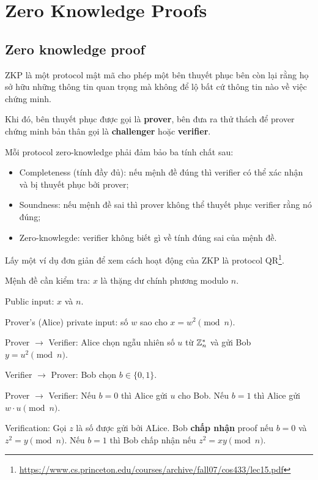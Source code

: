 \chapter{Zero Knowledge Proofs}

\section{Zero knowledge proof}

ZKP là một protocol mật mã cho phép một bên thuyết phục bên còn lại rằng họ sở hữu những thông tin quan trọng mà không để lộ bất cứ thông tin nào về việc chứng minh.

Khi đó, bên thuyết phục được gọi là \textbf{prover}, bên đưa ra thử thách để prover chứng minh bản thân gọi là \textbf{challenger} hoặc \textbf{verifier}.

Mỗi protocol zero-knowledge phải đảm bảo ba tính chất sau:

\begin{itemize}
    \item Completeness (tính đầy đủ): nếu mệnh đề đúng thì verifier có thể xác nhận và bị thuyết phục bởi prover;
    \item Soundness: nếu mệnh đề sai thì prover không thể thuyết phục verifier rằng nó đúng;
    \item Zero-knowlegde: verifier không biết gì về tính đúng sai của mệnh đề.
\end{itemize}

Lấy một ví dụ đơn giản để xem cách hoạt động của ZKP là protocol QR\footnote{\url{https://www.cs.princeton.edu/courses/archive/fall07/cos433/lec15.pdf}}.

\begin{example}
    Mệnh đề cần kiểm tra: $x$ là thặng dư chính phương modulo $n$.

    Public input: $x$ và $n$.

    Prover's (Alice) private input: số $w$ sao cho $x = w^2 \pmod n$.

    Prover $\to$ Verifier: Alice chọn ngẫu nhiên số $u$ từ $\mathbb{Z}_n^*$ và gửi Bob $y = u^2 \pmod n$.

    Verifier $\to$ Prover: Bob chọn $b \in \{ 0, 1 \}$.

    Prover $\to$ Verifier: Nếu $b = 0$ thì Alice gửi $u$ cho Bob. Nếu $b = 1$ thì Alice gửi $w \cdot u \pmod n$.

    Verification: Gọi $z$ là số được gửi bởi ALice. Bob \textbf{chấp nhận} proof nếu $b = 0$ và $z^2 = y \pmod n$. Nếu $b = 1$ thì Bob chấp nhận nếu $z^2 = xy \pmod n$.
\end{example}

